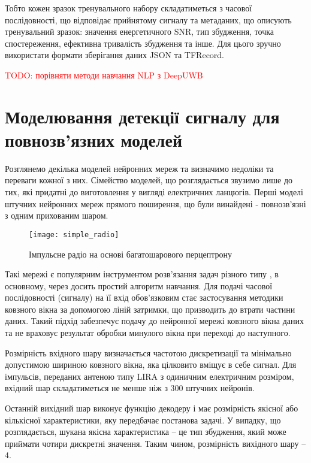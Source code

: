 Тобто кожен зразок тренувального набору складатиметься з часової
послідовності, що відповідає прийнятому сигналу та метаданих, що описують 
тренувальний зразок: значення енергетичного SNR, тип збудження, 
точка спостереження, ефективна тривалість збудження та інше. Для цього
зручно використати формати зберігання даних JSON та TFRecord.

\textcolor{red}{TODO: порівняти методи навчання NLP з DeepUWB}

\section{Моделювання детекції сигналу для повнозв'язних моделей}

Розглянемо декілька моделей нейронних мереж та визначимо недоліки та переваги
кожної з них. Сімейство моделей, що розглядається звузимо лише до тих, які 
придатні до виготовлення у вигляді електричних ланцюгів. Перші моделі штучних 
нейронних мереж прямого поширення, що були винайдені - повнозв'язні з одним 
прихованим шаром.


\begin{figure}[htbp] \begin{center}
\texttt{[image: simple\_radio]}
\caption{Імпульсне радіо на основі багатошарового перцептрону} 
\label{fig:mp_radio}
\end{center} \end{figure}

Такі мережі є популярним інструментом розв'язання задач різного типу 
\cite{imp:Kussul2004}, в основному, через досить простий алгоритм навчання.
Для подачі часової послідовності (сигналу) на її вхід обов'язковим стає 
застосування методики ковзного вікна за допомогою ліній затримки, що 
призводить до втрати частини даних. Такий підхід забезпечує подачу до 
нейронної мережі ковзного вікна даних та не враховує результат обробки 
минулого вікна при переході до наступного.

Розмірність вхідного шару визначається частотою дискретизації та мінімально 
допустимою шириною ковзного вікна, яка цілковито вміщує в себе сигнал. Для 
імпульсів, переданих антеною типу LIRA з одиничним електричним розміром, 
вхідний шар складатиметься не менше ніж з 300 штучних нейронів.

Останній вихідний шар виконує функцію декодеру і має розмірність 
якісної або кількісної характеристики, яку передбачає постанова задачі.
У випадку, що розглядається, шукана якісна характеристика -- це тип 
збудження, який може приймати чотири дискретні значення. Таким чином,
розмірність вихідного шару -- 4.

